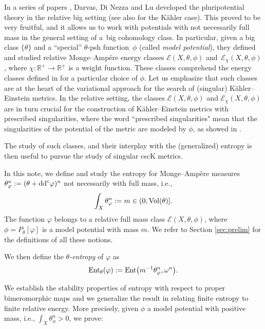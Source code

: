 \documentclass[pdftex]{sigma}
\numberwithin{equation}{section}
\theoremstyle{plain}
\newcommand{\R}{\mathbb R}
\newcommand \vol{{\rm Vol}}
\begin{document}
In a series of papers \cite{DDL3, DDL2, DDL1}, Darvas, Di Nezza and Lu developed the pluripotential theory in the relative big setting (see also \cite{Trus19, Trus20} for the K\"ahler case). This proved to be very fruitful, and it allows us to work with potentials with not necessarily full mass in the general setting of a~big cohomology class. In particular, given a big class $\{\theta\}$ and a ``special'' $\theta$-psh function~$\phi$ (called \emph{model potential}), they defined and studied relative Monge--Amp\'ere energy classes $\mathcal{E}(X, \theta, \phi)$ and~$\mathcal{E}_\chi(X, \theta, \phi)$, where $\chi\colon \R^+ \rightarrow \R^+$ is a weight function. These classes comprehend the energy classes defined in \cite{BEGZ10,GZ07} for a particular choice of $\phi$. Let us emphasize that such classes are at the heart of the variational approach for the search of (singular) K\"ahler--Einstein metrics. In the relative setting, the classes $\mathcal{E}(X, \theta, \phi)$ and $\mathcal{E}_\chi(X, \theta, \phi)$ are in turn crucial for the construction of K\"ahler--Einstein metrics with prescribed singularities, where the word ``prescribed singularities" mean that the singularities of the potential of the metric are modeled by $\phi$, as showed in \cite{DDL2, Tru1, Trus20b}.

The study of such classes, and their interplay with the (generalized) entropy is then useful to pursue the study of singular cscK metrics.

In this note, we define and study the entropy for Monge--Amp\`ere measures $\theta_\varphi^n:=(\theta+{\rm dd}^c \varphi )^n$ not necessarily with full mass, i.e.,
\[\int_X \theta_\varphi^n :=m \in (0, \vol(\theta)].\]
The function $\varphi$ belongs to a relative full mass class $ \mathcal{E}(X, \theta,\phi)$, where $\phi=P_\theta[\varphi]$ is a model potential with mass $m$. We refer to Section \ref{sec:prelim} for the definitions of all these notions.

We then define the $\theta$\emph{-entropy} of $\varphi$ as
\begin{equation*}%
 {\rm Ent}_\theta(\varphi):= {\rm Ent}\big( m^{-1}\theta_\varphi^n, {\omega^n}\big).
 \end{equation*}

 We establish the stability properties of entropy with respect to proper bimeromorphic maps and we generalize the result in \cite{DGL20} relating finite entropy to finite relative energy. More precisely, given $\phi$ a model potential with positive mass, i.e., $\int_X \theta_\phi^n>0$, we prove:
\end{document}
